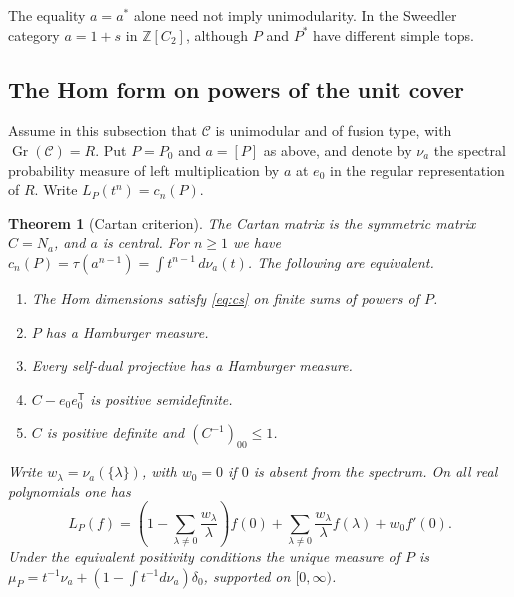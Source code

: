 \documentclass[11pt,reqno]{amsart}
\newtheorem{theorem}{Theorem}[section]
\theoremstyle{definition}
\newcommand{\C}{\mathcal C}
\newcommand{\ZZ}{\mathbb Z}
\DeclareMathOperator{\Gr}{Gr}
\begin{document}
The equality $a=a^*$ alone need not imply unimodularity. In the Sweedler category $a=1+s$ in $\ZZ[C_2]$, although $P$ and $P^*$ have different simple tops.

\subsection{The Hom form on powers of the unit cover}
Assume in this subsection that $\C$ is unimodular and of fusion type, with $\Gr(\C)=R$. Put $P=P_0$ and $a=[P]$ as above, and denote by
$\nu_a$ the spectral probability measure of left multiplication by $a$
at $e_0$ in the regular representation of $R$. Write $L_P(t^n)=c_n(P)$.

\begin{theorem}[Cartan criterion]\label{thm:cartan}
The Cartan matrix is the symmetric matrix $C=N_a$, and $a$ is central.
For $n\ge1$ we have $c_n(P)=\tau(a^{n-1})=\int t^{n-1}\,d\nu_a(t)$.
The following are equivalent.
\begin{enumerate}
\item The Hom dimensions satisfy \eqref{eq:cs} on finite sums of powers of $P$.
\item $P$ has a Hamburger measure.
\item Every self-dual projective has a Hamburger measure.
\item $C-e_0e_0^{\mathsf T}$ is positive semidefinite.
\item $C$ is positive definite and $(C^{-1})_{00}\le1$.
\end{enumerate}
Write $w_\lambda=\nu_a(\{\lambda\})$, with $w_0=0$ if $0$ is absent from the spectrum. On all real polynomials one has
\begin{equation}\label{eq:cartan-hermite}
 L_P(f)=\left(1-\sum_{\lambda\ne0}\frac{w_\lambda}{\lambda}\right)f(0)
       +\sum_{\lambda\ne0}\frac{w_\lambda}{\lambda}f(\lambda)+w_0 f'(0).
\end{equation}
Under the equivalent positivity conditions the unique measure of $P$ is $\mu_P=t^{-1}\nu_a+(1-\int t^{-1}d\nu_a)\delta_0$, supported on $[0,\infty)$.
\end{theorem}
\end{document}
